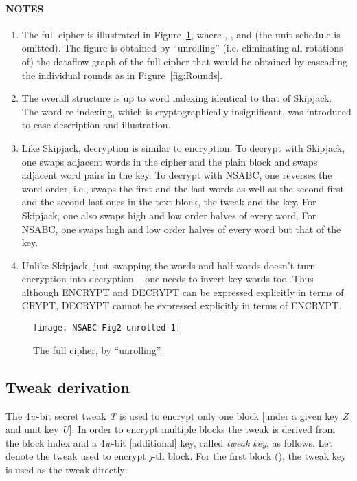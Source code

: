 \documentclass[a4paper,oneside,english]{amsart}
\numberwithin{equation}{section}
\numberwithin{figure}{section}
\begin{document}
\paragraph*{NOTES}
\begin{enumerate}
\item The full cipher is illustrated in Figure~\ref{fig:The-full-cipher-1},
where , , 
and  (the unit schedule is omitted). The
figure is obtained by {}``unrolling'' (i.e. eliminating all rotations
of) the dataflow graph of the full cipher that would be obtained by
cascading the individual rounds as in Figure~\ref{fig:Rounds}.
\item The overall structure is up to word indexing identical to that of
Skipjack. The word re-indexing, which is cryptographically insignificant,
was introduced to ease description and illustration.
\item Like Skipjack, decryption is similar to encryption. To decrypt with
Skipjack, one swaps adjacent words in the cipher and the plain block
and swaps adjacent word pairs in the key. To decrypt with NSABC, one
reverses the word order, i.e., swaps the first and the last words
as well as the second first and the second last ones in the text block,
the tweak and the key. For Skipjack, one also swaps high and low order
halves of every word. For NSABC, one swaps high and low order halves
of every word but that of the key.
\item Unlike Skipjack, just swapping the words and half-words doesn't turn
encryption into decryption -- one needs to invert key words too. Thus
although ENCRYPT and DECRYPT can be expressed explicitly in terms
of CRYPT, DECRYPT cannot be expressed explicitly in terms of ENCRYPT.
\end{enumerate}
\begin{figure}
{\scriptsize \texttt{[image: NSABC-Fig2-unrolled-1]}}{\scriptsize \par}

\caption{\label{fig:The-full-cipher-1}The full cipher, by {}``unrolling''.}
\end{figure}



\subsection{Tweak derivation}

The 4\emph{w}-bit secret tweak \emph{T} is used to encrypt only one
block {[}under a given key \emph{Z} and unit key \emph{U}{]}. In order
to encrypt multiple blocks the tweak is derived from the block index
and a 4\emph{w}-bit {[}additional{]} key, called \emph{tweak key},
as follows. Let  denote the tweak used to encrypt \emph{j}-th
block. For the first block (), the tweak key is used as the
tweak directly: 
\end{document}
